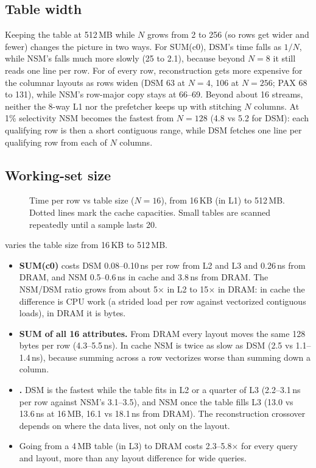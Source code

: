\subsection{Table width}
\label{sec:res:width}

Keeping the table at 512\,MB while $N$ grows from 2 to 256 (so rows get wider and fewer)
changes the picture in two ways. For SUM(c0), DSM's time falls as $1/N$, while NSM's falls much
more slowly (25 to 2.1\ms), because beyond $N{=}8$ it still reads one line per row. For
 of every row, reconstruction gets more expensive for the columnar layouts as
rows widen (DSM 63\ms{} at $N{=}4$, 106\ms{} at $N{=}256$; PAX 68 to 131\ms), while NSM's
row-major copy stays at 66--69\ms. Beyond about 16 streams, neither the 8-way L1 nor the
prefetcher keeps up with stitching $N$ columns. At 1\% selectivity NSM becomes the fastest from
$N{=}128$ (4.8 vs 5.2\ms{} for DSM): each qualifying row is then a short contiguous range,
while DSM fetches one line per qualifying row from each of $N$ columns.

\subsection{Working-set size}
\label{sec:res:ws}

\begin{figure}[t]
\centering
{}
\caption{Time per row vs table size ($N{=}16$), from 16\,KB (in L1) to 512\,MB. Dotted lines
mark the cache capacities. Small tables are scanned repeatedly until a sample lasts 20\ms.}
\label{fig:workingset}
\end{figure}

 varies the table size from 16\,KB to 512\,MB.
\begin{itemize}
\item \textbf{SUM(c0)} costs DSM 0.08--0.10\,ns per row from L2 and L3 and 0.26\,ns from
DRAM, and NSM 0.5--0.6\,ns in cache and 3.8\,ns from DRAM. The NSM/DSM ratio grows from about
5$\times$ in L2 to 15$\times$ in DRAM: in cache the difference is CPU work (a strided load per
row against vectorized contiguous loads), in DRAM it is bytes.
\item \textbf{SUM of all 16 attributes.} From DRAM every layout moves the same 128 bytes per
row (4.3--5.5\,ns). In cache NSM is twice as slow as DSM (2.5 vs 1.1--1.4\,ns), because summing
across a row vectorizes worse than summing down a column.
\item \textbf{.} DSM is the fastest while the table fits in L2 or a quarter of
L3 (2.2--3.1\,ns per row against NSM's 3.1--3.5), and NSM once the table fills L3 (13.0 vs
13.6\,ns at 16\,MB, 16.1 vs 18.1\,ns from DRAM). The reconstruction crossover depends on
where the data lives, not only on the layout.
\item Going from a 4\,MB table (in L3) to DRAM costs 2.3--5.8$\times$ for every query and
layout, more than any layout difference for wide queries.
\end{itemize}

